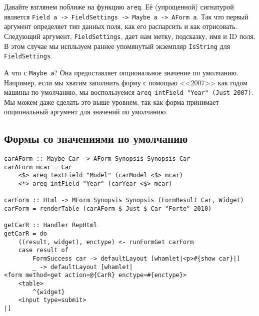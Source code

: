 Давайте взглянем поближе на функцию \lstinline'areq'. Её (упрощенной) сигнатурой является
\lstinline'Field a -> FieldSettings -> Maybe a -> AForm a'. 
Так что первый аргумент определяет тип данных поля, как его распарсить и как отрисовать.
Следующий аргумент, \lstinline'FieldSettings', дает нам метку, подсказку, имя и  ID
поля. В этом случае мы испльзуем раннее упомянутый экземпляр \lstinline'IsString' для 
\lstinline'FieldSettings'.

А что с \lstinline'Maybe a'? Она предоставляет опциональное значение по умолчанию. 
Например, если мы хватим заполнить форму с помощью <<2007>> как годом машины по
умолчанию, мы воспользуемся \lstinline'аreq intField "Year" (Just 2007)'. Мы можем даже
сделать это выше уровнем, так как форма принимает опциональный аргумент для значений по
умолчанию.

\subsection{Формы со значениями по умолчанию}
\begin{remark}
\begin{lstlisting}
carAForm :: Maybe Car -> AForm Synopsis Synopsis Car
carAForm mcar = Car
    <$> areq textField "Model" (carModel <$> mcar)
    <*> areq intField "Year" (carYear <$> mcar)

carForm :: Html -> MForm Synopsis Synopsis (FormResult Car, Widget)
carForm = renderTable (carAForm $ Just $ Car "Forte" 2010)

getCarR :: Handler RepHtml
getCarR = do
    ((result, widget), enctype) <- runFormGet carForm
    case result of
        FormSuccess car -> defaultLayout [whamlet|<p>#{show car}|]
        _ -> defaultLayout [whamlet|
<form method=get action=@{CarR} enctype=#{enctype}>
    <table>
        ^{widget}
    <input type=submit>
|]
\end{lstlisting}
\end{remark}

